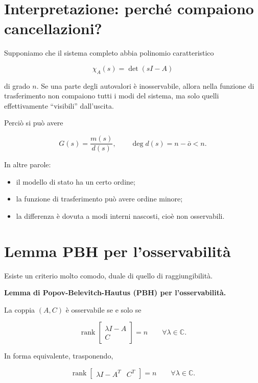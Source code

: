 \bigskip

\section{Interpretazione: perché compaiono cancellazioni?}

Supponiamo che il sistema completo abbia polinomio caratteristico

\[
\chi_A(s)=\det(sI-A)
\]

di grado \(n\). Se una parte degli autovalori è inosservabile, allora nella funzione di trasferimento non compaiono tutti i modi del sistema, ma solo quelli effettivamente ``visibili'' dall'uscita.

Perciò si può avere

\[
G(s)=\frac{m(s)}{d(s)}, \qquad \deg d(s)=n-\bar o<n.
\]

In altre parole:
\begin{itemize}
    \item il modello di stato ha un certo ordine;
    \item la funzione di trasferimento può avere ordine minore;
    \item la differenza è dovuta a modi interni nascosti, cioè non osservabili.
\end{itemize}

\bigskip

\section{Lemma PBH per l'osservabilità}

Esiste un criterio molto comodo, duale di quello di raggiungibilità.

\medskip

\noindent\textbf{Lemma di Popov-Belevitch-Hautus (PBH) per l'osservabilità.}

La coppia \((A,C)\) è osservabile se e solo se

\[
\operatorname{rank}
\begin{bmatrix}
\lambda I-A\\
C
\end{bmatrix}
= n
\qquad \forall \lambda\in\mathbb C.
\]

In forma equivalente, trasponendo,

\[
\operatorname{rank}
\begin{bmatrix}
\lambda I-A^T & C^T
\end{bmatrix}
= n
\qquad \forall \lambda\in\mathbb C.
\]

